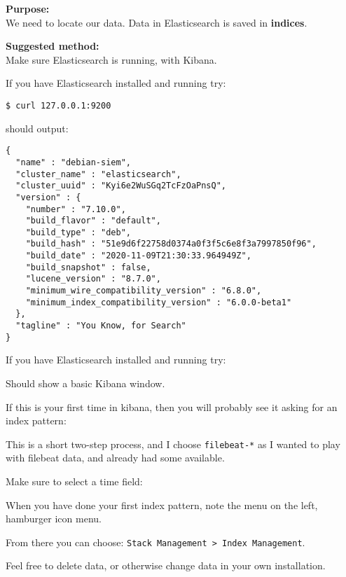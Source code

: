 \documentclass[a4paper,11pt,notitlepage]{report}
\begin{document}
{\bf Purpose:}\\
We need to locate our data. Data in Elasticsearch is saved in {\bf indices}.


{\bf Suggested method:}\\
Make sure Elasticsearch is running, with Kibana.

If you have Elasticsearch installed and running try: 

\begin{verbatim}
$ curl 127.0.0.1:9200
\end{verbatim}
should output:
\begin{verbatim}
{
  "name" : "debian-siem",
  "cluster_name" : "elasticsearch",
  "cluster_uuid" : "Kyi6e2WuSGq2TcFzOaPnsQ",
  "version" : {
    "number" : "7.10.0",
    "build_flavor" : "default",
    "build_type" : "deb",
    "build_hash" : "51e9d6f22758d0374a0f3f5c6e8f3a7997850f96",
    "build_date" : "2020-11-09T21:30:33.964949Z",
    "build_snapshot" : false,
    "lucene_version" : "8.7.0",
    "minimum_wire_compatibility_version" : "6.8.0",
    "minimum_index_compatibility_version" : "6.0.0-beta1"
  },
  "tagline" : "You Know, for Search"
}
\end{verbatim}


If you have Elasticsearch installed and running try: 

Should show a basic Kibana window.


If this is your first time in kibana, then you will probably see it asking for an index pattern:

This is a short two-step process, and I choose \verb+filebeat-*+ as I wanted to play with filebeat data, and already had some available.


Make sure to select a time field:


When you have done your first index pattern, note the menu on the left, hamburger icon menu.

From there you can choose: \verb+Stack Management > Index Management+.


Feel free to delete data, or otherwise change data in your own installation.
\end{document}
